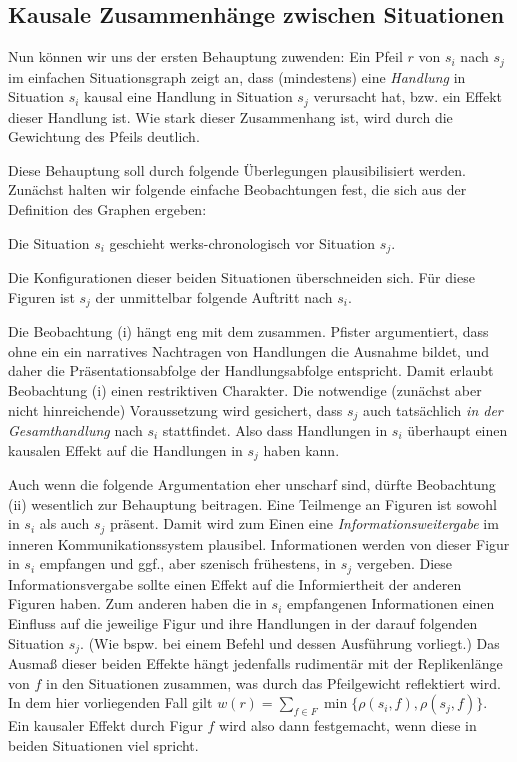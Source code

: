 \documentclass[a4paper,10pt,abstract=true,headings=small]{scrartcl}
\begin{document}
\subsection{Kausale Zusammenhänge zwischen Situationen}


Nun können wir uns der ersten Behauptung zuwenden:
Ein Pfeil $r$ von $s_i$ nach $s_j$ im einfachen Situationsgraph zeigt an, dass (mindestens) eine \emph{Handlung} in Situation $s_i$ kausal eine Handlung in Situation $s_j$ verursacht hat, bzw. ein Effekt dieser Handlung ist.
Wie stark dieser Zusammenhang ist, wird durch die Gewichtung des Pfeils deutlich.

Diese Behauptung soll durch folgende Überlegungen plausibilisiert werden. 
Zunächst halten wir folgende einfache Beobachtungen fest, die sich aus der Definition des Graphen ergeben:
\begin{enumerate*}
    \item Die Situation $s_i$ geschieht werks-chronologisch vor Situation $s_j$. %
    \item Die Konfigurationen dieser beiden Situationen überschneiden sich.
        Für diese Figuren ist $s_j$ der unmittelbar folgende Auftritt nach $s_i$.
\end{enumerate*}

Die Beobachtung (i) hängt eng mit dem  zusammen.
Pfister argumentiert, dass ohne ein  ein narratives Nachtragen von Handlungen die Ausnahme bildet, und daher die Präsentationsabfolge der Handlungsabfolge entspricht.\autocite[Vgl.][273]{pfister_drama:_2001}
Damit erlaubt Beobachtung (i) einen restriktiven Charakter.
Die notwendige (zunächst aber nicht hinreichende) Voraussetzung wird gesichert, dass $s_j$ auch tatsächlich \emph{in der Gesamthandlung} nach $s_i$ stattfindet.
Also dass Handlungen in $s_i$ überhaupt einen kausalen Effekt auf die Handlungen in $s_j$ haben kann.

Auch wenn die folgende Argumentation eher unscharf sind, dürfte Beobachtung (ii) wesentlich zur Behauptung beitragen.
Eine Teilmenge an Figuren ist sowohl in $s_i$ als auch $s_j$ präsent.
Damit wird zum Einen eine \emph{Informationsweitergabe} im inneren Kommunikationssystem plausibel.\autocite[Vgl.][Absch.~3]{pfister_drama:_2001}
Informationen werden von dieser Figur in $s_i$ empfangen und ggf., aber szenisch frühestens, in $s_j$ vergeben.
Diese Informationsvergabe sollte einen Effekt auf die Informiertheit der anderen Figuren haben.
Zum anderen haben die in $s_i$ empfangenen Informationen einen Einfluss auf die jeweilige Figur und ihre Handlungen in der darauf folgenden Situation $s_j$. (Wie bspw. bei einem Befehl und dessen Ausführung vorliegt.)
Das Ausmaß dieser beiden Effekte hängt jedenfalls rudimentär mit der Replikenlänge von $f$ in den Situationen zusammen, was durch das Pfeilgewicht reflektiert wird.
In dem hier vorliegenden Fall gilt $w(r) = \sum_{f\in F} \min \{ \rho(s_i, f), \rho(s_j, f) \}$.
Ein kausaler Effekt durch Figur $f$ wird also dann festgemacht, wenn diese in beiden Situationen viel spricht.
\end{document}

